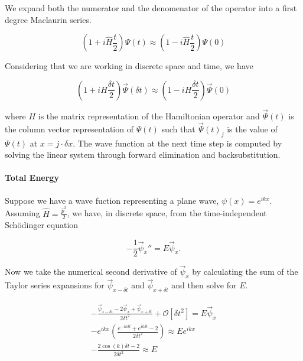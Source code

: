 \documentclass[letterpaper,12pt]{article}
\begin{document}
    We expand both the numerator and the denomenator of the operator into a
    first degree Maclaurin series.

    \[
        \left( 1 + i\hat{H} \frac{t}{2} \right) \Psi(t) \approx
        \left( 1 - i\hat{H} \frac{t}{2} \right) \Psi(0)
    \]

    \pagebreak

    Considering that we are working in discrete space and time, we have

    \begin{equation}
        \left( 1 + iH \frac{\delta t}{2} \right) \vec{\Psi}(\delta t) \approx
        \left( 1 - iH \frac{\delta t}{2} \right) \vec{\Psi}(0)
        \label{impsch}
    \end{equation}

    where $H$ is the matrix representation of the Hamiltonian operator and
    $\vec{\Psi}(t)$ is the column vector representation of $\Psi(t)$ such that
    $\vec{\Psi}(t)_j$ is the value of $\Psi(t)$ at $x = j \cdot \delta x$. The
    wave function at the next time step is computed by solving the linear system
    through forward elimination and backsubstitution.

    \paragraph{Total Energy} Suppose we have a wave fuction representing a plane
    wave, $\psi(x) = e^{ikx}$. Assuming $\hat{H} = \frac{\hat{p}^2}{2}$, we
    have, in discrete space, from the time-independent Schödinger equation

    \[
        -\frac{1}{2}\vec{\psi}_x'' = E \vec{\psi}_x.
    \]

    Now we take the numerical second derivative of $\vec{\psi}_x$ by calculating
    the sum of the Taylor series expansions for $\vec{\psi}_{x - \delta t}$ and
    $\vec{\psi}_{x + \delta t}$ and then solve for $E$.

    \begin{gather*}
        -\frac{\vec{\psi}_{x - \delta t} - 2\vec{\psi}_x + \vec{\psi}_{x +
        \delta t}}{2 \delta t^2} + \mathcal{O}\left[\delta t^2\right]
        = E \vec{\psi}_x
        \\
        -e^{ikx}
        \left(
        \frac{e^{-ik\delta t} + e^{ik\delta t} - 2}{2 \delta t^2}
        \right)
        \approx E e^{ikx}
        \\
        -\frac{2\cos(k)\delta t - 2}{2\delta t^2} \approx E
    \end{gather*}
\end{document}
